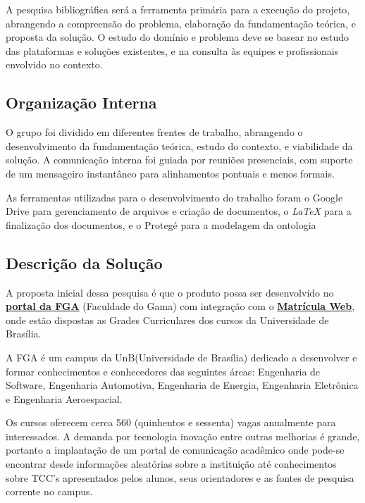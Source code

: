 
A pesquisa bibliográfica será a ferramenta primária para a execução do projeto, abrangendo a compreensão do problema, elaboração da fundamentação teórica, e proposta da solução. O estudo do domínio e problema deve se basear no estudo das plataformas e soluções existentes, e na consulta às equipes e profissionais envolvido no contexto.

\subsection{Organização Interna}

O grupo foi dividido em diferentes frentes de trabalho, abrangendo o desenvolvimento da fundamentação teórica, estudo do contexto, e viabilidade da solução. A comunicação interna foi guiada por reuniões presenciais, com suporte de um mensageiro instantâneo para alinhamentos pontuais e menos formais.

As ferramentas utilizadas para o desenvolvimento do trabalho foram o Google Drive para gerenciamento de arquivos e criação de documentos, o \textit{LaTeX} para a finalização dos documentos, e o Protegé para a modelagem da ontologia


\subsection{Descrição da Solução} %
\label{sub:desc_da_solu_o}

	A proposta inicial dessa pesquisa é que o produto possa ser desenvolvido no \href{https://fga.unb.br/}{\textbf{portal da FGA}} (Faculdade do Gama) com integração com o \href{http://matriculaweb.unb.br}{\textbf{Matrícula Web}}, onde estão dispostas as Grades Curriculares dos cursos da Universidade de Brasília.

		A FGA é um campus da UnB(Universidade de Brasília) dedicado a desenvolver e formar conhecimentos e conhecedores das seguintes áreas: Engenharia de Software, Engenharia Automotiva, Engenharia de Energia, Engenharia Eletrônica e Engenharia Aeroespacial. 

	Os cursos oferecem cerca 560 (quinhentos e sessenta) vagas anualmente para interessados. A demanda por tecnologia inovação entre outras melhorias é grande, portanto a implantação de um portal de comunicação acadêmico onde pode-se encontrar desde informações aleatórias sobre a instituição até conhecimentos sobre TCC’s apresentados pelos alunos, seus orientadores e as fontes de pesquisa corrente no campus. 

